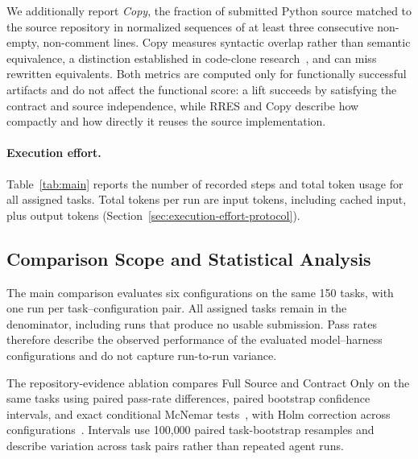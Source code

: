 \documentclass[acmsmall,screen,review,anonymous]{acmart}
\begin{document}
We additionally report \emph{Copy}, the fraction of submitted Python source
matched to the source repository in normalized sequences of at least three
consecutive non-empty, non-comment lines. Copy measures syntactic overlap rather than semantic
equivalence, a distinction established in code-clone
research~\cite{roy2009clones}, and can miss rewritten equivalents.
Both metrics are computed only for functionally successful artifacts and do not
affect the functional score: a lift succeeds by satisfying the contract and
source independence, while RRES and Copy describe how compactly and how directly
it reuses the source implementation.

\paragraph{Execution effort.}
Table~\ref{tab:main} reports the number of recorded steps and total token
usage for all assigned tasks. Total tokens per run are input tokens, including
cached input, plus output tokens (Section~\ref{sec:execution-effort-protocol}).

\subsection{Comparison Scope and Statistical Analysis}
\label{sec:statistics}

The main comparison evaluates six configurations on the same 150 tasks, with
one run per task--configuration pair. All assigned tasks remain in
the denominator, including runs that produce no usable submission. Pass rates
therefore describe the observed performance of the evaluated model--harness
configurations and do not capture run-to-run variance.

The repository-evidence ablation compares Full Source and Contract Only on the same
tasks using paired pass-rate differences, paired bootstrap confidence intervals,
and exact conditional McNemar tests~\cite{fagerland2013mcnemar}, with Holm
correction across configurations~\cite{holm1979multiple}. Intervals use
100{,}000 paired task-bootstrap resamples and describe variation across task
pairs rather than repeated agent runs.
\end{document}
